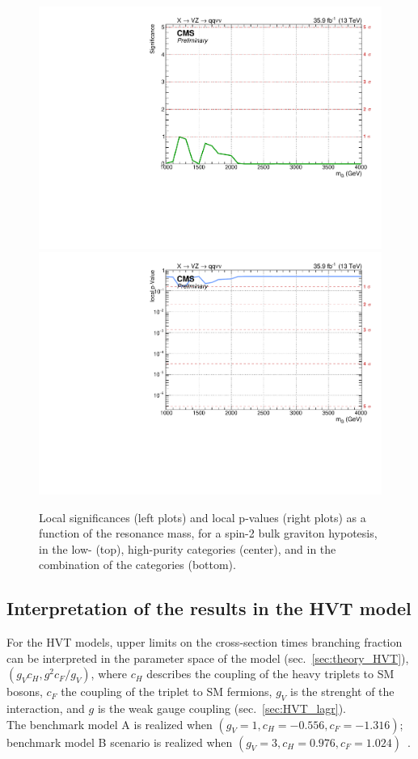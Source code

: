 \begin{figure}[!htb]
\begin{center}
     \includegraphics[width=.495\textwidth]{v9/plotsAlpha/Limits/Significance_XZZInv_XVZnn.pdf}%
     \includegraphics[width=.495\textwidth]{v9/plotsAlpha/Limits/pValue_XZZInv_XVZnn.pdf}

  \end{center}
  \caption{Local significances (left plots) and local p-values (right plots) as a function of the resonance mass, for a spin-2 bulk graviton hypotesis, in the low- (top), high-purity categories (center), and in the combination of the categories (bottom).}
  \label{fig:Signif_XZZInv}
\end{figure}

\clearpage 

\subsection{Interpretation of the results in the HVT model}

For the HVT models, upper limits on the cross-section times branching fraction can be interpreted in the parameter space of the model (sec.~\ref{sec:theory_HVT}), $\left( g_V c_H, g^2 c_F /g_V \right)$, where $c_H$ describes the coupling of the heavy triplets to SM bosons, $c_F$ the coupling of the triplet to SM fermions, $g_V$ is the strenght of the interaction, and $g$ is the weak gauge coupling (sec.~\ref{sec:HVT_lagr}).\\
The benchmark model A is realized when $\left( g_V = 1, c_H = -0.556, c_F = -1.316 \right)$; benchmark model B scenario is realized when $\left( g_V = 3, c_H = 0.976, c_F = 1.024 \right)$~\cite{Pappadopulo2014}.

